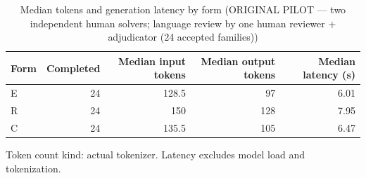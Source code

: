 \begin{table}[t]
\centering
\small
\caption{Median tokens and generation latency by form (ORIGINAL PILOT --- two independent human solvers; language review by one human reviewer + adjudicator (24 accepted families))}
\label{tab:pilotorig-Llama-3.2-3B-Instruct-resources}
\begin{tabular}{lrrrr}
\toprule
Form & Completed & Median input tokens & Median output tokens & Median latency (s) \\
\midrule
E & 24 & 128.5 & 97 & 6.01 \\
R & 24 & 150 & 128 & 7.95 \\
C & 24 & 135.5 & 105 & 6.47 \\
\bottomrule
\end{tabular}
\par\smallskip
\parbox{\linewidth}{\footnotesize Token count kind: actual tokenizer. Latency excludes model load and tokenization.}
\end{table}
